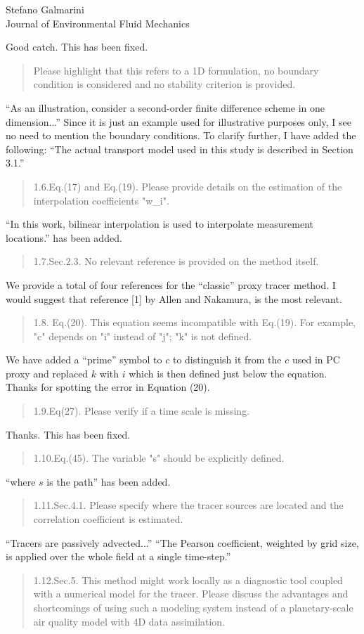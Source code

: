 \documentclass{letter}
\begin{document}
\begin{letter}{Stefano Galmarini\\
Journal of Environmental Fluid Mechanics}
\begin{quote}
\end{quote}
Good catch. This has been fixed.
\begin{quote}
Please highlight that this refers to a 1D formulation, no boundary condition is considered and no stability criterion is provided.
\end{quote}
``As an illustration, consider a second-order finite difference scheme in one dimension...''
Since it is just an example used for illustrative purposes only, I see no need to mention the boundary conditions. 
To clarify further, I have added the following: ``The actual transport model used in this study is described in Section 3.1.''
\begin{quote}
1.6.Eq.(17) and Eq.(19). Please provide details on the estimation of the interpolation coefficients "w\_i".
\end{quote}
``In this work, bilinear interpolation is used to interpolate measurement
locations.'' has been added.
\begin{quote}
1.7.Sec.2.3. No relevant reference is provided on the method itself.
\end{quote}
We provide a total of four references for the ``classic'' proxy tracer method.
I would suggest that reference [1] by Allen and Nakamura, is the most
relevant.
\begin{quote}
1.8. Eq.(20). This equation seems incompatible with Eq.(19). For example, "c" depends on "i" instead of "j"; "k" is not defined.
\end{quote}
We have added a ``prime'' symbol to $c$ to distinguish it from the $c$ used in
PC proxy and replaced $k$ with $i$ which is then defined just below the equation. Thanks for spotting the error in Equation (20).
\begin{quote}
1.9.Eq(27). Please verify if a time scale is missing.
\end{quote}
Thanks. This has been fixed.
\begin{quote}
1.10.Eq.(45). The variable "s" should be explicitly defined.
\end{quote}
``where $s$ is the path'' has been added.
\begin{quote}
1.11.Sec.4.1. Please specify where the tracer sources are located and the correlation coefficient is estimated.
\end{quote}
``Tracers are passively advected...''
``The Pearson coefficient, weighted by grid size, is applied over the whole field at a single time-step.''
\begin{quote}
1.12.Sec.5. This method might work locally as a diagnostic tool coupled with a numerical model for the tracer. Please discuss the advantages and shortcomings of using such a modeling system instead of a planetary-scale air quality model with 4D data assimilation.

\end{quote}
\end{letter}
\end{document}

